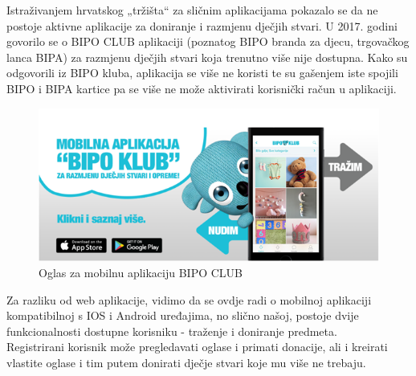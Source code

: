 		\eject
		Istraživanjem hrvatskog „tržišta“ za sličnim aplikacijama pokazalo se da ne postoje aktivne aplikacije za doniranje i razmjenu dječjih stvari. U 2017. godini govorilo se o BIPO CLUB aplikaciji (poznatog BIPO branda za djecu, trgovačkog lanca BIPA) za razmjenu dječjih stvari koja trenutno više nije dostupna. Kako su odgovorili iz BIPO kluba, aplikacija se više ne koristi te su gašenjem iste spojili BIPO i BIPA kartice pa se više ne može aktivirati korisnički račun u aplikaciji.
		\begin{figure}[h!]
			\center
			\includegraphics[width=\textwidth,height=0.2\textheight]{./slike/Picture1.png}
			\caption{Oglas za mobilnu aplikaciju BIPO CLUB}
			\label{fig1}
		\end{figure}
		\newline
		Za razliku od web aplikacije, vidimo da se ovdje radi o mobilnoj aplikaciji kompatibilnoj s IOS i Android uređajima, no slično našoj, postoje dvije funkcionalnosti dostupne korisniku - traženje i doniranje predmeta. \\
		\newline
		Registrirani korisnik može pregledavati oglase i primati donacije, ali i kreirati vlastite oglase i tim putem donirati dječje stvari koje mu više ne trebaju.\\
		
